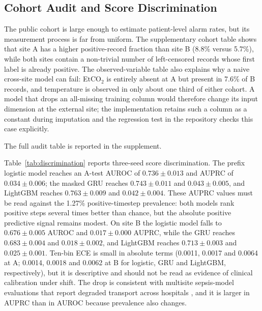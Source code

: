 \subsection{Cohort Audit and Score Discrimination}

The public cohort is large enough to estimate patient-level alarm rates, but its measurement process is far from uniform. The supplementary cohort table shows that site A has a higher positive-record fraction than site B (8.8\% versus 5.7\%), while both sites contain a non-trivial number of left-censored records whose first label is already positive. The observed-variable table also explains why a naive cross-site model can fail: EtCO$_2$ is entirely absent at A but present in 7.6\% of B records, and temperature is observed in only about one third of either cohort. A model that drops an all-missing training column would therefore change its input dimension at the external site; the implementation retains such a column as a constant during imputation and the regression test in the repository checks this case explicitly.

The full audit table is reported in the supplement.

Table~\ref{tab:discrimination} reports three-seed score discrimination. The prefix logistic model reaches an A-test AUROC of $0.736\pm0.013$ and AUPRC of $0.034\pm0.006$; the masked GRU reaches $0.743\pm0.011$ and $0.043\pm0.005$, and LightGBM reaches $0.763\pm0.009$ and $0.042\pm0.004$. These AUPRC values must be read against the 1.27\% positive-timestep prevalence: both models rank positive steps several times better than chance, but the absolute positive predictive signal remains modest. On site B the logistic model falls to $0.676\pm0.005$ AUROC and $0.017\pm0.000$ AUPRC, while the GRU reaches $0.683\pm0.004$ and $0.018\pm0.002$, and LightGBM reaches $0.713\pm0.003$ and $0.025\pm0.001$. Ten-bin ECE is small in absolute terms (0.0011, 0.0017 and 0.0064 at A; 0.0014, 0.0018 and 0.0062 at B for logistic, GRU and LightGBM, respectively), but it is descriptive and should not be read as evidence of clinical calibration under shift. The drop is consistent with multisite sepsis-model evaluations that report degraded transport across hospitals \citep{valan2025evaluating,ostermayer2024external}, and it is larger in AUPRC than in AUROC because prevalence also changes.

